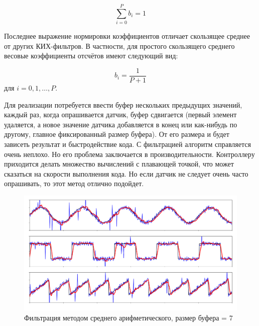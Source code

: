 \begin{equation}
	\sum_{i=0}^{P} b_i = 1
\end{equation}
	
Последнее выражение нормировки коэффициентов отличает скользящее среднее от других КИХ-фильтров. В частности, для простого скользящего среднего весовые коэффициенты отсчётов имеют следующий вид:

\begin{equation}
	b_{i}=\frac{1}{P+1} 
\end{equation}
для $i=0,1,\dots,P$.

Для реализации потребуется ввести буфер нескольких предыдущих значений, каждый раз, когда опрашивается датчик, буфер сдвигается (первый элемент удаляется, а новое значение датчика добавляется в конец или как-нибудь по другому, главное фиксированный размер буфера). От его размера и будет зависеть результат и быстродействие кода. С фильтрацией алгоритм справляется очень неплохо. Но его проблема заключается в производительности. Контроллеру приходится делать множество вычислений с плавающей точкой, что может сказаться на скорости выполнения кода. Но если датчик не следует очень часто опрашивать, то этот метод отлично подойдет.

\begin{figure}[h]
	\begin{center}
		\includegraphics[pages=-, scale=0.32]{./inc/img/3.png}
		\caption{Фильтрация методом среднего арифметического, размер буфера = 7}  
		\label{img_3}
	\end{center}
\end{figure}


